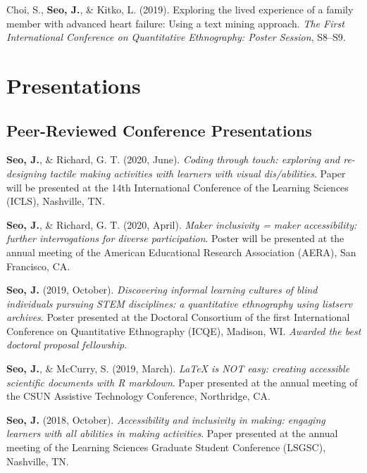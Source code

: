 \documentclass[11pt, a4paper]{awesome-cv}
\begin{document}
\leavevmode\hypertarget{ref-choi2019exploring}{}%
Choi, S., \textbf{Seo, J.}, \& Kitko, L. (2019). Exploring the lived experience of a family member with advanced heart failure: Using a text mining approach. \emph{The First International Conference on Quantitative Ethnography: Poster Session}, S8--S9.

\endgroup

\hypertarget{presentations}{%
\section{Presentations}\label{presentations}}

\hypertarget{peer-reviewed-conference-presentations}{%
\subsection{Peer-Reviewed Conference Presentations}\label{peer-reviewed-conference-presentations}}

\begingroup
\setlength{\parindent}{-0.5in}
\setlength{\leftskip}{0.5in}

\textbf{Seo, J.}, \& Richard, G. T. (2020, June). \emph{Coding through touch: exploring and re-designing tactile making activities with learners with visual dis/abilities}. Paper will be presented at the 14th International Conference of the Learning Sciences (ICLS), Nashville, TN.

\textbf{Seo, J.}, \& Richard, G. T. (2020, April). \emph{Maker inclusivity = maker accessibility: further interrogations for diverse participation}. Poster will be presented at the annual meeting of the American Educational Research Association (AERA), San Francisco, CA.

\textbf{Seo, J.} (2019, October). \emph{Discovering informal learning cultures of blind individuals pursuing STEM disciplines: a quantitative ethnography using listserv archives}. Poster presented at the Doctoral Consortium of the first International Conference on Quantitative Ethnography (ICQE), Madison, WI. \emph{Awarded the best doctoral proposal fellowship}.

\textbf{Seo, J.}, \& McCurry, S. (2019, March). \emph{LaTeX is NOT easy: creating accessible scientific documents with R markdown}. Paper presented at the annual meeting of the CSUN Assistive Technology Conference, Northridge, CA.

\textbf{Seo, J.} (2018, October). \emph{Accessibility and inclusivity in making: engaging learners with all abilities in making activities}. Paper presented at the annual meeting of the Learning Sciences Graduate Student Conference (LSGSC), Nashville, TN.
\end{document}
